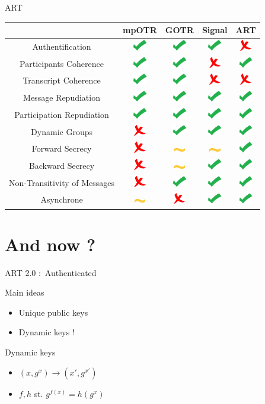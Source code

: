 \documentclass{beamer}
\newcommand{\okay}{\includegraphics[height=0.5cm]{img/check.png}}
\newcommand{\nope}{\includegraphics[height=0.5cm]{img/cross.png}}
\newcommand{\sortof}{\includegraphics[width=0.5cm]{img/tilde.png}}
\newcommand{\ra}{\rightarrow}
\begin{document}
\begin{frame}{ART}
	\center
  	\begin{tabular}{c|cccc}
			                              & mpOTR   & GOTR    & Signal  & ART\\
			\hline
  		Authentification              & \okay   & \okay   & \okay   & \nope \\
  		\hline
  		Participants Coherence        & \okay   & \okay   & \nope   & \okay \\
  		Transcript Coherence          & \okay   & \okay   & \nope   & \nope \\
  		\hline
  		Message Repudiation           & \okay   & \okay   & \okay   & \okay \\
  		Participation Repudiation     & \okay   & \okay   & \okay   & \okay \\
  		\hline
  		Dynamic Groups                & \nope   & \okay   & \okay   & \okay\\
  		\hline
  		Forward Secrecy               & \nope   & \sortof & \sortof & \okay \\
  		Backward Secrecy              & \nope   & \sortof & \okay   & \okay\\
  		Non-Transitivity of Messages  & \nope   & \okay   & \okay   & \okay \\
  		\hline
  		Asynchrone                    & \sortof & \nope   & \okay   & \okay 
    \end{tabular}
\end{frame}

\section{And now ?}
\begin{frame}{ART 2.0 : Authenticated}
	\begin{block}{Main ideas}
		\begin{itemize}
			\item Unique public keys
			\item Dynamic keys ! 
		\end{itemize}		
	\end{block}
	\pause
	\begin{block}{Dynamic keys}
		\begin{itemize}
			\item $(x, g^x) \ra (x', g^{x'})$
			\item $f, h$ st. $g^{f(x)} = h(g^x)$
		\end{itemize}
	\end{block}
\end{frame}
\end{document}

